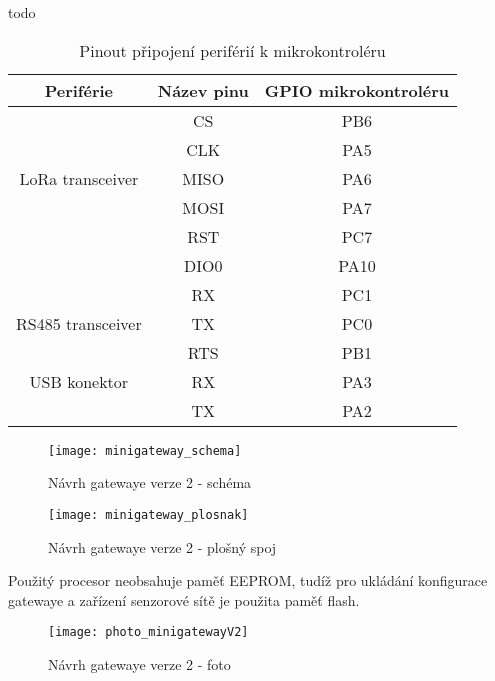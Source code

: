 todo
\begin{longtable}{ |c|c|c| }

    \caption{Pinout připojení periférií k mikrokontroléru}
    \label{table:Pinout připojení periférií k mikrokontroléru} \\
\hline

Periférie          & Název pinu & GPIO mikrokontroléru           \\ \hline \hline

            & CS    &  PB6             \\
            & CLK   &  PA5        \\
LoRa transceiver    & MISO  &  PA6     \\
            & MOSI  &  PA7        \\
            & RST   & PC7          \\
            & DIO0  & PA10         \\
            \hline

            & RX  &   PC1            \\
RS485 transceiver   & TX  &   PC0       \\
            & RTS  &  PB1      \\     \hline

USB konektor        & RX    & PA3    \\
            & TX    & PA2   \\          \hline


\end{longtable}





\begin{figure}[!h]
    \centering
    \texttt{[image: minigateway\_schema]}
    \caption{Návrh gatewaye verze 2 - schéma}
    \label{fig:minigateway_schema}
\end{figure}

\begin{figure}[!h]
    \centering
    \texttt{[image: minigateway\_plosnak]}
    \caption{Návrh gatewaye verze 2 - plošný spoj}
    \label{fig:minigateway_plosnak}
\end{figure}

Použitý procesor neobsahuje paměť EEPROM, tudíž pro ukládání konfigurace gatewaye a zařízení senzorové sítě je použita paměť flash.



\begin{figure}[!h]
    \centering
    \texttt{[image: photo\_minigatewayV2]}
    \caption{Návrh gatewaye verze 2 - foto}
    \label{fig:minigateway_plosnak}
\end{figure}



